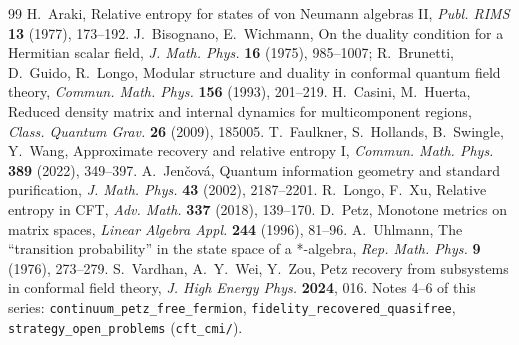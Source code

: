 \documentclass[11pt]{article}
\theoremstyle{accent}
\theoremstyle{definition}
\begin{document}
\begin{thebibliography}{99}
 H.~Araki, Relative entropy for states of von Neumann algebras II, \emph{Publ. RIMS} \textbf{13} (1977), 173--192.
 J.~Bisognano, E.~Wichmann, On the duality condition for a Hermitian scalar field, \emph{J. Math. Phys.} \textbf{16} (1975), 985--1007; R.~Brunetti, D.~Guido, R.~Longo, Modular structure and duality in conformal quantum field theory, \emph{Commun. Math. Phys.} \textbf{156} (1993), 201--219.
 H.~Casini, M.~Huerta, Reduced density matrix and internal dynamics for multicomponent regions, \emph{Class. Quantum Grav.} \textbf{26} (2009), 185005.
 T.~Faulkner, S.~Hollands, B.~Swingle, Y.~Wang, Approximate recovery and relative entropy I, \emph{Commun. Math. Phys.} \textbf{389} (2022), 349--397.
 A.~Jen\v cov\'a, Quantum information geometry and standard purification, \emph{J. Math. Phys.} \textbf{43} (2002), 2187--2201.
 R.~Longo, F.~Xu, Relative entropy in CFT, \emph{Adv. Math.} \textbf{337} (2018), 139--170.
 D.~Petz, Monotone metrics on matrix spaces, \emph{Linear Algebra Appl.} \textbf{244} (1996), 81--96.
 A.~Uhlmann, The ``transition probability'' in the state space of a *-algebra, \emph{Rep. Math. Phys.} \textbf{9} (1976), 273--279.
 S.~Vardhan, A.~Y.~Wei, Y.~Zou, Petz recovery from subsystems in conformal field theory, \emph{J. High Energy Phys.} \textbf{2024}, 016.
 Notes 4--6 of this series: \texttt{continuum\_petz\_free\_fermion}, \texttt{fidelity\_recovered\_quasifree}, \texttt{strategy\_open\_problems} (\texttt{cft\_cmi/}).
\end{thebibliography}
\end{document}
